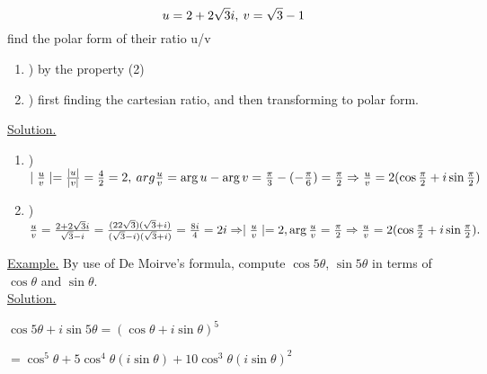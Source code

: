 \documentclass[15pt]{amsbook}
\begin{document}




\begin{equation*}
    \centering
    u = 2 + 2\sqrt{3}i, \: v = \sqrt{3}-1
\end{equation*}
find the polar form of their ratio u/v

\begin{enumerate}[label=\alph*]
    \item) by the property (2)
    \item) first finding the cartesian ratio, and then transforming to polar form.
\end{enumerate}

\underline{Solution.}
\begin{enumerate}[label=\alph*]
    \item) $ \mid \frac{u}{v} \mid = \frac{\mid u \mid}{\mid v \mid} = \frac{4}{2} = 2, \: arg\frac{u}{v} = \arg u - \arg v = \frac{\pi}{3} - (-\frac{\pi}{6}) = \frac{\pi}{2}  \\\\
     \Rightarrow \frac{u}{v} = 2 (\cos \frac{\pi}{2} + i\sin \frac{\pi}{2}) $\\
    
    \item) $ \frac{u}{v} = \frac{2 + 2\sqrt{3}i}{\sqrt{3}-i} =  \frac{(2
    2\sqrt{3})(\sqrt{3}+i)}{(\sqrt{3}-i)(\sqrt{3}+i)} = \frac{8i}{4} = 2i\\\\ \Rightarrow \mid \frac{u}{v} \mid = 2 , \arg \frac{u}{v} = \frac{\pi}{2}\\\\\Rightarrow \frac{u}{v}=2(\cos\frac{\pi}{2}+i\sin\frac{\pi}{2}).$\\
\end{enumerate}

\underline{Example.} By use of De Moirve's formula, compute $\cos5\theta$, $\sin5\theta$ in terms of $\cos\theta$ and $\sin\theta$.\\

\underline{Solution.}
    
    $\cos5\theta+i\sin5\theta = (\cos\theta+i\sin\theta)^5$
    
    $= \cos^5\theta+5\cos^4\theta(i\sin\theta)+10\cos^3\theta(i\sin\theta)^2$
    
\end{document}
